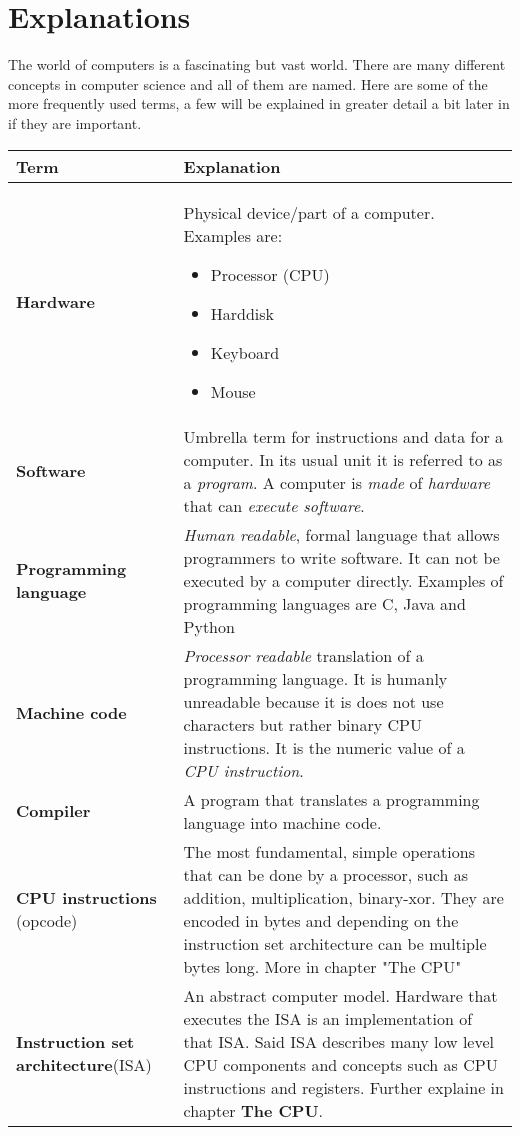 \section{Explanations}
The world of computers is a fascinating but vast world. There are many different concepts in computer science and all of them are named.
Here are some of the more frequently used terms, a few will be explained in greater detail a bit later in if they are important.

\begin{tabular}{ | m{20mm} | m{60mm} |}
\textbf{Term} & \textbf{Explanation} \\
\hline
\textbf{Hardware} & Physical device/part of a computer. Examples are: \begin{itemize}
\item Processor (CPU)
\item Harddisk
\item Keyboard
\item Mouse
\end{itemize} \\
\textbf{Software} & Umbrella term for instructions and data for a computer. In its usual unit it is referred to as a \textit{program}. A computer is \textit{made} of \textit{hardware} that can \textit{execute software}. \\
\textbf{Programming language} & \textit{Human readable}, formal language that allows programmers to write software. It can not be executed by a computer directly. Examples of programming languages are C, Java and Python \\
\textbf{Machine code} & \textit{Processor readable} translation of a programming language. It is humanly unreadable because it is does not use characters but rather binary CPU instructions. It is the numeric value of a \textit{CPU instruction}. \\
\textbf{Compiler} & A program that translates a programming language into machine code. \\
\textbf{CPU instructions} (opcode) & The most fundamental, simple operations that can be done by a processor, such as addition, multiplication, binary-xor. They are encoded in bytes and depending on the instruction set architecture can be multiple bytes long. More in chapter "The CPU" \\
        \textbf{Instruction set architecture}(ISA) & An abstract computer model. Hardware that executes the ISA is an implementation of that ISA. Said ISA describes many low level CPU components and concepts such as CPU instructions and registers. Further explaine in chapter \textbf{The CPU}. \\

\end{tabular}
